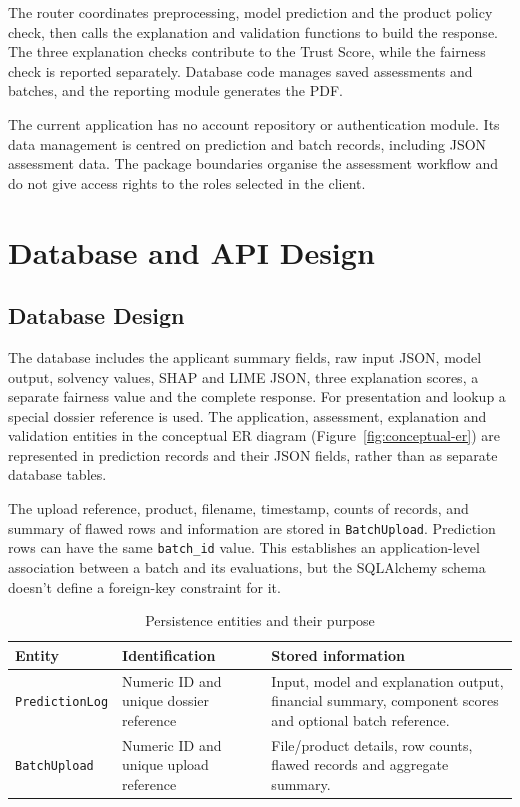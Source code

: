 The router coordinates preprocessing, model prediction and the product policy check, then calls the explanation and validation functions to build the response. The three explanation checks contribute to the Trust Score, while the fairness check is reported separately. Database code manages saved assessments and batches, and the reporting module generates the PDF.

The current application has no account repository or authentication module. Its data management is centred on prediction and batch records, including JSON assessment data. The package boundaries organise the assessment workflow and do not give access rights to the roles selected in the client.


\clearpage
\section{Database and API Design}
\subsection{Database Design}
The database includes the applicant summary fields, raw input JSON, model output, solvency values, SHAP and LIME JSON, three explanation scores, a separate fairness value and the complete response. For presentation and lookup a special dossier reference is used. The application, assessment, explanation and validation entities in the conceptual ER diagram (Figure~\ref{fig:conceptual-er}) are represented in prediction records and their JSON fields, rather than as separate database tables.

The upload reference, product, filename, timestamp, counts of records, and summary of flawed rows and information are stored in \texttt{BatchUpload}. Prediction rows can have the same \texttt{batch\_id} value. This establishes an application-level association between a batch and its evaluations, but the SQLAlchemy schema doesn't define a foreign-key constraint for it.

\begin{table}[htbp]\centering\small
\caption{Persistence entities and their purpose}\label{tab:database-entities}
\begin{tabularx}{\textwidth}{p{3.1cm}XX}\toprule
Entity & Identification & Stored information\\\midrule
\texttt{PredictionLog} & Numeric ID and unique dossier reference & Input, model and explanation output, financial summary, component scores and optional batch reference.\\
\texttt{BatchUpload} & Numeric ID and unique upload reference & File/product details, row counts, flawed records and aggregate summary.\\\bottomrule
\end{tabularx}\end{table}

